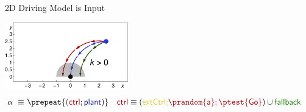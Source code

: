 \documentclass[slidestop,aspectratio=169]{beamer}
\newcommand{\xgvar}{\textsf{x}}
\newcommand{\ygvar}{\textsf{y}}
\newcommand{\kvar}{\textsf{k}}
\newcommand{\tvar}{\textsf{t}}
\newcommand{\Tvar}{{\sf T}\xspace}
\newcommand{\vvar}{{\sf v}\xspace}
\newcommand{\avar}{{\sf a}\xspace}
\newcommand{\ctrl}{\textsf{ctrl}\xspace}
\newcommand{\ctrlliv}{\ctrl_{\text{a}}}
\newcommand{\plant}{\textsf{plant}\xspace}
\newcommand{\fallback}{\textsf{\upshape fallback}\xspace}
\newcommand{\extCtrl}{\textsf{\upshape extCtrl}\xspace}
\theoremstyle{plain}
\theoremstyle{definition}
\theoremstyle{remark}
\newcommand{\ctrlcolor}[1]{{\color{vred}{#1}}}
\newcommand{\extCtrlcolor}[1]{{\color{myyellow}{#1}}}
\newcommand{\fallbackcolor}[1]{{\color{vgreen}{#1}}}
\newcommand{\plantcolor}[1]{{\color{vblue}{#1}}}
\newcommand{\moncolor}[1]{\plantcolor{#1}}
\begin{document}

\newcommand{\admiss}{\textsf{Go}}
\newcommand{\planreq}{\textsf{Feas}}
\newcommand{\veps}{\varepsilon}
\newcommand{\annul}{\textsf{Ann}\xspace}
\newcommand{\adjustSpeedDist}{\delta_\mathsf{Lim}\xspace}
\newcommand{\controllableGoalDist}{\mathsf{Lim}}
\begin{frame}[t]{2D Driving Model is Input}
\noindent
\begin{center}
\includegraphics[width=0.4\textwidth]{graphics/fig-ode2.pdf}%
\\%
{\small\begin{align*}
\alpha~\equiv~& \prepeat{(\ctrlcolor{\ctrl}; \plantcolor{\plant})}\ \ \ \ctrlcolor{\ctrl} \equiv  (\extCtrlcolor{\extCtrl;} \ctrlcolor{\prandom{\avar}; \ptest{\admiss}}) \cup \fallbackcolor{\fallback}
\end{align*}}\\
\begin{align*}
\phantom{\textsf{Safe}} &\phantom{\equiv \dbox{\prepeat{(\ctrlcolor{\ctrl};\plantcolor{\plant})}}{\textsf{safe}}}\\%
\phantom{\textsf{Live}} &\phantom{\equiv \ddiamond{\prepeat{(\ctrlcolor{\ctrl};\plantcolor{\plant})}}{\textsf{goal}}}\\%
\phantom{\textsf{Win}}  &\phantom{\equiv \ddiamond{\prepeat{(\ctrlcolor{\ctrl};\plantcolor{\plant};\ptest{\textsf{safe}})}}{\textsf{goal}}}%
\end{align*}
\end{center}
\end{frame}
\end{document}
